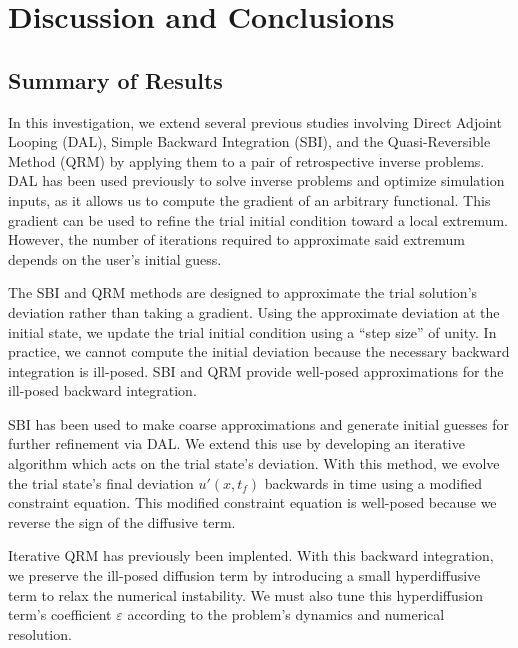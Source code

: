 \documentclass[%
 reprint,
 amsmath,amssymb,
 aps,
 pre,
]{revtex4-2}
\begin{document}
\section{Discussion and Conclusions}
\label{secCon}
\subsection{Summary of Results}
\label{secConSummary}
In this investigation, we extend several previous studies involving Direct Adjoint Looping (DAL), Simple Backward Integration (SBI), and the Quasi-Reversible Method (QRM) by applying them to a pair of retrospective inverse problems. 
DAL has been used previously to solve inverse problems and optimize simulation inputs, as it allows us to compute the gradient of an arbitrary functional.
This gradient can be used to refine the trial initial condition toward a local extremum.
However, the number of iterations required to approximate said extremum depends on the user's initial guess.

The SBI and QRM methods are designed to approximate the trial solution's deviation rather than taking a gradient.
Using the approximate deviation at the initial state, we update the trial initial condition using a ``step size'' of unity.
In practice, we cannot compute the initial deviation because the necessary backward integration is ill-posed.
SBI and QRM provide well-posed approximations for the ill-posed backward integration.

SBI has been used to make coarse approximations and generate initial guesses for further refinement via DAL.
We extend this use by developing an iterative algorithm which acts on the trial state's deviation.
With this method, we evolve the trial state's final deviation $u'(x,t_f)$ backwards in time using a modified constraint equation.
This modified constraint equation is well-posed because we reverse the sign of the diffusive term.

Iterative QRM has previously been implented.
With this backward integration, we preserve the ill-posed diffusion term by introducing a small hyperdiffusive term to relax the numerical instability.
We must also tune this hyperdiffusion term's coefficient $\varepsilon$ according to the problem's dynamics and numerical resolution.
\end{document}
